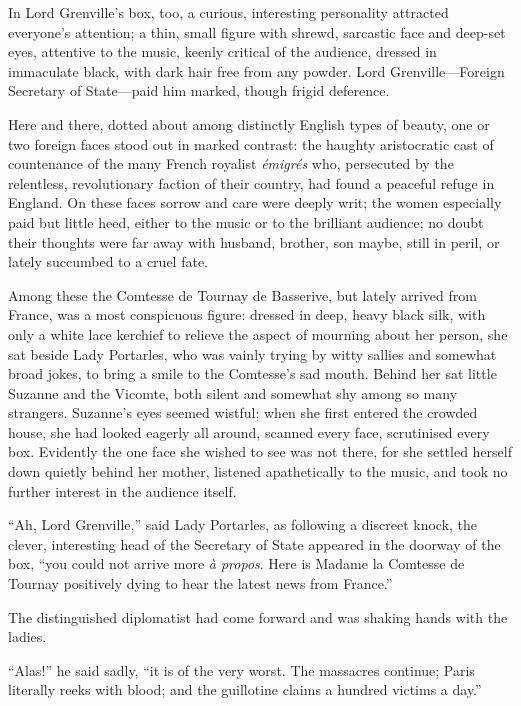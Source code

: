 \documentclass[paper=5.5in:8.5in,BCOR=7mm,twoside,DIV=calc,12pt,usegeometry,chapterprefix,endperiod,headings=big]{scrbook}
\begin{document}
In Lord Grenville's box, too, a curious, interesting personality attracted everyone's attention; a thin, small figure with shrewd, sarcastic face and deep-set eyes, attentive to the music, keenly critical of the audience, dressed in immaculate black, with dark hair free from any powder. Lord Grenville---Foreign Secretary of State---paid him marked, though frigid deference.

Here and there, dotted about among distinctly English types of beauty, one or two foreign faces stood out in marked contrast: the haughty aristocratic cast of countenance of the many French royalist \textit{émigrés} who, persecuted by the relentless, revolutionary faction of their country, had found a peaceful refuge in England. On these faces sorrow and care were deeply writ; the women especially paid but little heed, either to the music or to the brilliant audience; no doubt their thoughts were far away with husband, brother, son maybe, still in peril, or lately succumbed to a cruel fate.

Among these the Comtesse de Tournay de Basserive, but lately arrived from France, was a most conspicuous figure: dressed in deep, heavy black silk, with only a white lace kerchief to relieve the aspect of mourning about her person, she sat beside Lady Portarles, who was vainly trying by witty sallies and somewhat broad jokes, to bring a smile to the Comtesse's sad mouth. Behind her sat little Suzanne and the Vicomte, both silent and somewhat shy among so many strangers. Suzanne's eyes seemed wistful; when she first entered the crowded house, she had looked eagerly all around, scanned every face, scrutinised every box. Evidently the one face she wished to see was not there, for she settled herself down quietly behind her mother, listened apathetically to the music, and took no further interest in the audience itself.

\enquote{Ah, Lord Grenville,} said Lady Portarles, as following a discreet knock, the clever, interesting head of the Secretary of State appeared in the doorway of the box, \enquote{you could not arrive more \textit{à propos}. Here is Madame la Comtesse de Tournay positively dying to hear the latest news from France.}

The distinguished diplomatist had come forward and was shaking hands with the ladies.

\enquote{Alas!} he said sadly, \enquote{it is of the very worst. The massacres continue; Paris literally reeks with blood; and the guillotine claims a hundred victims a day.}
\end{document}
